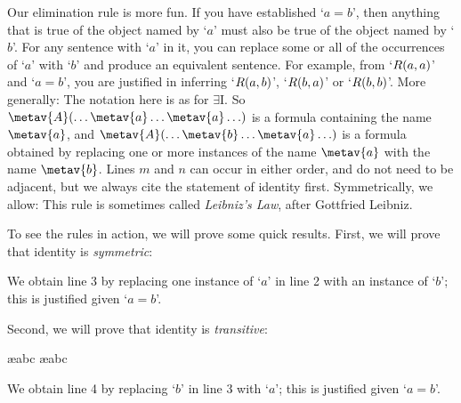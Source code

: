 Our elimination rule is more fun. If you have established `$a=b$', then anything that is true of the object named by `$a$' must also be true of the object named by `$b$'. For any sentence with `$a$' in it, you can replace some or all of the occurrences of `$a$' with `$b$' and produce an equivalent sentence. For example, from `$\mathord{R}(a,a)$' and `$a = b$', you are justified in inferring `$\mathord{R}(a,b)$', `$\mathord{R}(b,a)$' or `$\mathord{R}(b,b)$'. More generally:
The notation here is as for $\exists$I. So $\metav{A}(\ldots \metav{a} \ldots \metav{a}\ldots)$ is a formula containing the name $\metav{a}$, and $\metav{A}(\ldots \metav{b} \ldots \metav{a}\ldots)$ is a formula obtained by replacing one or more instances of the name $\metav{a}$ with the name $\metav{b}$. Lines $m$ and $n$ can occur in either order, and do not need to be adjacent, but we always cite the statement of identity first. Symmetrically, we allow:
This rule is sometimes called \emph{Leibniz's Law}, after Gottfried Leibniz.

To see the rules in action, we will prove some quick results. First, we will prove that identity is \emph{symmetric}:
\begin{fitchproof}
	\open
		\AS
	\close
\end{fitchproof}
We obtain line 3 by replacing one instance of `$a$' in line 2 with an instance of `$b$'; this is justified given `$a= b$'.

Second, we will prove that identity is \emph{transitive}:
\begin{fitchproof}
	\open
		\AS
		\ae{abc}
		\ae{abc}
	\close
\end{fitchproof}
We obtain line 4 by replacing `$b$' in line 3 with `$a$'; this is justified given `$a= b$'.

